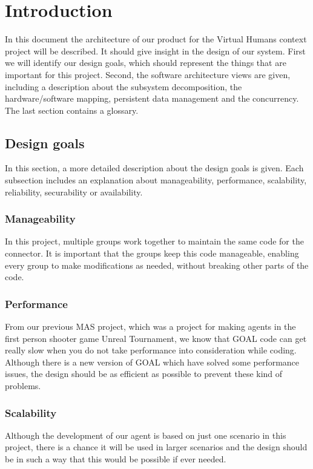 \section{Introduction}

In this document the architecture of our product for the Virtual Humans context project will be described. It should give insight in the design of our system. First we will identify our design goals, which should represent the things that are important for this project. Second, the software architecture views are given, including a description about the subsystem decomposition, the hardware/software mapping, persistent data management and the concurrency. The last section contains a glossary.


\subsection{Design goals}
In this section, a more detailed description about the design goals is given. Each subsection includes an explanation about manageability, performance, scalability, reliability, securability or availability.

\subsubsection*{Manageability}
In this project, multiple groups work together to maintain the same code for the connector. It is important that the groups keep this code manageable, enabling every group to make modifications as needed, without breaking other parts of the code.

\subsubsection*{Performance}
From our previous MAS project, which was a project for making agents in the first person shooter game Unreal Tournament, we know that GOAL code can get really slow when you do not take performance into consideration while coding. Although there is a new version of GOAL which have solved some performance issues, the design should be as efficient as possible to prevent these kind of problems.

\subsubsection*{Scalability}
Although the development of our agent is based on just one scenario in this project, there is a chance it will be used in larger scenarios and the design should be in such a way that this would be possible if ever needed.

